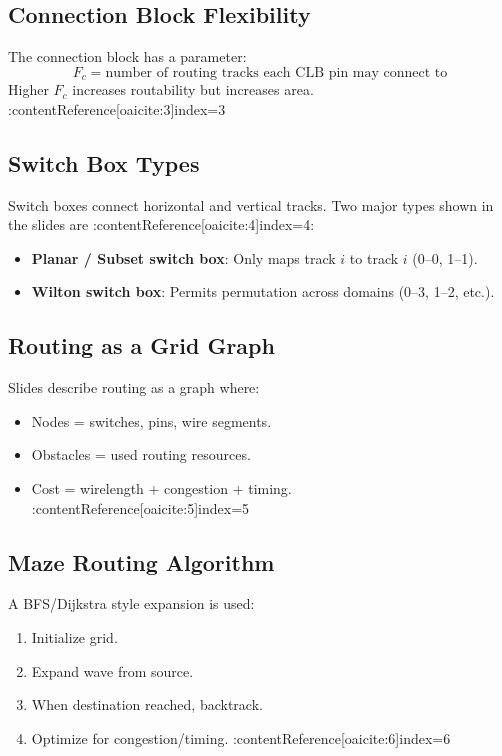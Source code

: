 \documentclass[11pt]{article}
\begin{document}
\subsection{Connection Block Flexibility}
The connection block has a parameter:
\[
F_c = \text{number of routing tracks each CLB pin may connect to}
\]
Higher $F_c$ increases routability but increases area. :contentReference[oaicite:3]{index=3}

\subsection{Switch Box Types}
Switch boxes connect horizontal and vertical tracks. Two major types shown in the slides are
:contentReference[oaicite:4]{index=4}:
\begin{itemize}
    \item \textbf{Planar / Subset switch box}: Only maps track $i$ to track $i$ (0--0, 1--1).
    \item \textbf{Wilton switch box}: Permits permutation across domains (0--3, 1--2, etc.).
\end{itemize}

\subsection{Routing as a Grid Graph}
Slides describe routing as a graph where:
\begin{itemize}
    \item Nodes = switches, pins, wire segments.
    \item Obstacles = used routing resources.
    \item Cost = wirelength + congestion + timing. :contentReference[oaicite:5]{index=5}
\end{itemize}

\subsection{Maze Routing Algorithm}
A BFS/Dijkstra style expansion is used:
\begin{enumerate}
    \item Initialize grid.
    \item Expand wave from source.
    \item When destination reached, backtrack.
    \item Optimize for congestion/timing. :contentReference[oaicite:6]{index=6}
\end{enumerate}
\end{document}
